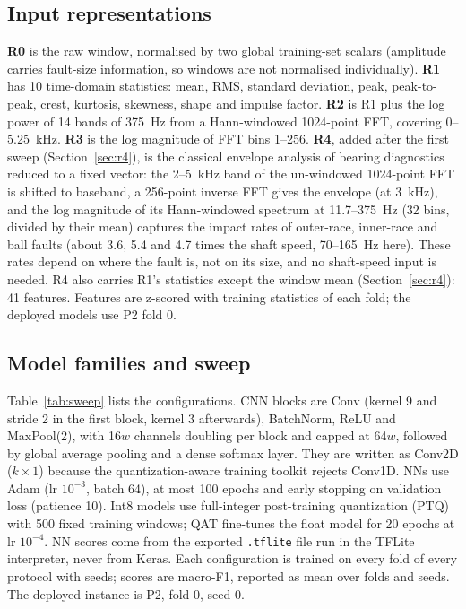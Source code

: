 \documentclass[conference]{IEEEtran}
\begin{document}
\subsection{Input representations}
\textbf{R0} is the raw window, normalised by two global training-set scalars (amplitude carries fault-size
information, so windows are not normalised individually). \textbf{R1} has 10 time-domain statistics: mean, RMS,
standard deviation, peak, peak-to-peak, crest, kurtosis, skewness, shape and impulse factor. \textbf{R2} is R1 plus
the log power of 14 bands of 375~Hz from a Hann-windowed 1024-point FFT, covering 0--5.25~kHz.
\textbf{R3} is the log magnitude of FFT bins 1--256. \textbf{R4}, added after the first sweep (Section~\ref{sec:r4}),
is the classical envelope analysis of bearing diagnostics \cite{randall2011rolling,smith2015rolling} reduced to a fixed
vector: the 2--5~kHz band of the un-windowed 1024-point FFT is shifted to baseband, a 256-point inverse FFT gives the
envelope (at 3~kHz), and the log magnitude of its Hann-windowed spectrum at 11.7--375~Hz (32 bins, divided by their
mean) captures the impact rates of outer-race, inner-race and ball faults (about 3.6, 5.4 and 4.7 times the shaft
speed, 70--165~Hz here). These rates depend on where the fault is, not on its size, and no shaft-speed input is needed.
R4 also carries R1's statistics except the window mean (Section~\ref{sec:r4}): 41 features. Features are z-scored with
training statistics of each fold; the deployed models use P2 fold 0.

\subsection{Model families and sweep}
Table~\ref{tab:sweep} lists the \NumConfigs{} configurations. CNN blocks are Conv (kernel 9 and stride 2 in the first
block, kernel 3 afterwards), BatchNorm, ReLU and MaxPool(2), with 16$w$ channels doubling per block and capped at
64$w$, followed by global average pooling and a dense softmax layer. They are written as Conv2D ($k\times1$) because
the quantization-aware training toolkit rejects Conv1D. NNs use Adam (lr $10^{-3}$, batch 64), at most 100 epochs and
early stopping on validation loss (patience 10). Int8 models use full-integer post-training quantization (PTQ) with
500 fixed training windows; QAT fine-tunes the float model for 20 epochs at lr $10^{-4}$. NN scores come from the
exported \texttt{.tflite} file run in the TFLite interpreter, never from Keras. Each configuration is trained on every
fold of every protocol with \NumSeedsMax{} seeds; scores are macro-F1, reported as
mean over folds and seeds. The deployed instance is P2, fold 0, seed 0.
\end{document}
